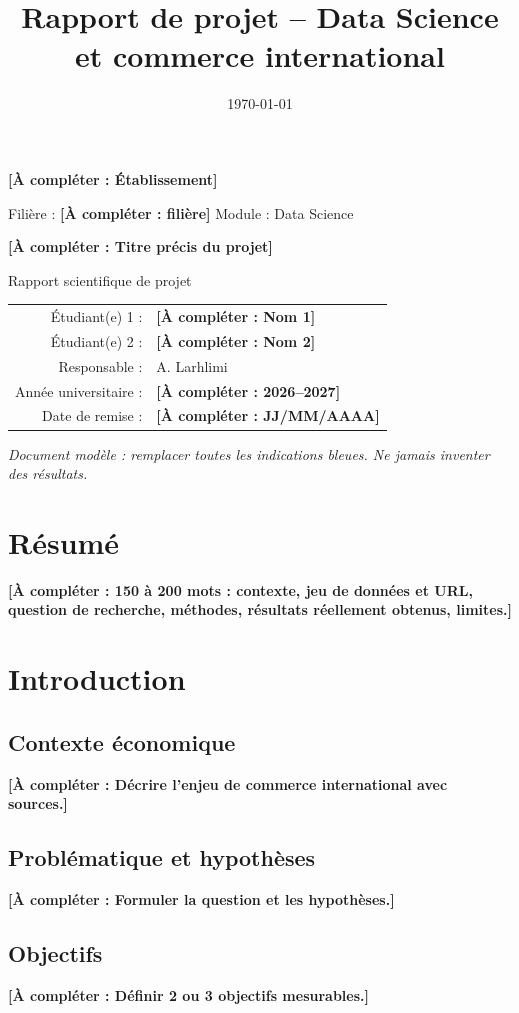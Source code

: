 \documentclass[11pt,a4paper]{article}
\title{\textbf{Rapport de projet -- Data Science et commerce international}}
\author{\achanger{Binôme : Noms et prénoms}}
\date{\today}
\newcommand{\achanger}[1]{\textcolor{blue!60!black}{\textbf{[À compléter : #1]}}}
\begin{document}
\begin{titlepage}
\centering
{\Large \achanger{Établissement} \par}
\vspace{1cm}
{\large Filière : \achanger{filière} \quad Module : Data Science\par}
\vspace{1.8cm}
{\Huge\bfseries \achanger{Titre précis du projet}\par}
\vspace{1.5cm}
{\Large Rapport scientifique de projet\par}
\vspace{1.5cm}
\begin{tabular}{rl}
Étudiant(e) 1 : & \achanger{Nom 1} \\
Étudiant(e) 2 : & \achanger{Nom 2} \\
Responsable : & A. Larhlimi \\
Année universitaire : & \achanger{2026--2027} \\
Date de remise : & \achanger{JJ/MM/AAAA} \\
\end{tabular}
\vfill
\textit{Document modèle : remplacer toutes les indications bleues. Ne jamais inventer des résultats.}
\end{titlepage}
\section*{Résumé}
\achanger{150 à 200 mots : contexte, jeu de données et URL, question de recherche, méthodes, résultats réellement obtenus, limites.}
\tableofcontents\newpage
\section{Introduction}\label{sec:intro}
\subsection{Contexte économique}\achanger{Décrire l'enjeu de commerce international avec sources.}
\subsection{Problématique et hypothèses}\achanger{Formuler la question et les hypothèses.}
\subsection{Objectifs}\achanger{Définir 2 ou 3 objectifs mesurables.}
\end{document}
